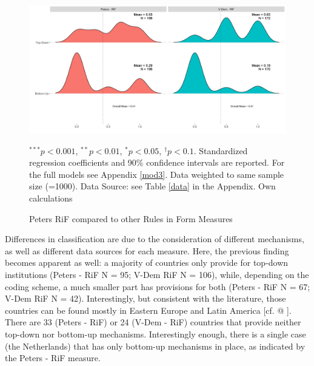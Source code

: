 \documentclass{systats}
\begin{document}
\begin{figure}
	\caption{Peters RiF compared to other Rules in Form Measures}
	\label{reg2}
	\includegraphics[width=\textwidth]{images/type_rif.png}
	\flushright
	{\scriptsize $^{***}p<0.001$, $^{**}p<0.01$, $^*p<0.05$, $^{\dagger}p<0.1$. Standardized regression coefficients and 90\% confidence intervals are reported. For the full models see Appendix \ref{mod3}. Data weighted to same sample size (=1000). Data Source: see Table \ref{data} in the Appendix. Own calculations  \par}
\end{figure}



Differences in classification are due to the consideration of different mechanisms, as well as different data sources for each measure. Here, the previous finding becomes apparent as well: a majority of countries only provide for top-down institutions (Peters - RiF N = 95; V-Dem RiF N = 106), while, depending on the coding scheme, a much smaller part has provisions for both (Peters - RiF N = 67; V-Dem RiF N = 42). Interestingly, but consistent with the literature, those countries can be found mostly in Eastern Europe and Latin America [cf. @ ]. There are 33 (Peters - RiF) or 24 (V-Dem - RiF) countries that provide neither top-down nor bottom-up mechanisms. Interestingly enough, there is a single case (the Netherlands) that has only bottom-up mechanisms in place, as indicated by the Peters - RiF measure.
\end{document}

